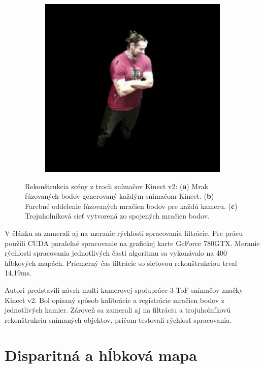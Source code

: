 \begin{figure}[H]
\begin{subfigure}[b]{0.315\textwidth}
		\caption{}
		\label{fig:resers:s}
	\end{subfigure}
	\hfill
	\begin{subfigure}[b]{0.32\textwidth}
		\centering
		\includegraphics[width=\textwidth]{figures/resers_t.png}
		\caption{}
		\label{fig:resers:t}
	\end{subfigure}
	\caption{Rekonštrukcia scény z troch snímačov Kinect v2:
		(\textbf{a}) Mrak fúzovaných bodov generovaný každým snímačom Kinect.
		(\textbf{b}) Farebné oddelenie fúzovaných mračien bodov pre každú kameru.
		(\textbf{c}) Trojuholníková sieť vytvorená zo spojených mračien bodov.}
	\label{fig:resers:6}
\end{figure}

V článku sa zamerali aj na meranie rýchlosti spracovania filtrácie. Pre prácu použili CUDA paralelné spracovanie na grafickej karte GeForce 780GTX. 
Meranie rýchlosti spracovania jednotlivých častí algoritmu sa vykonávalo na 400 hĺbkových mapách. Priemerný čas filtrácie so sieťovou rekonštrukciou trval 14,19ms. 

Autori predstavili návrh multi-kamerovej spolupráce 3 ToF snímačov značky Kinect v2. Bol opísaný spôsob kalibrácie a registrácie mračien bodov z jednotlivých kamier. Zároveň sa zamerali aj na filtráciu a trojuholníkovú rekonštrukciu snímaných objektov, pričom testovali rýchlosť spracovania.

\section{Disparitná a hĺbková mapa}

